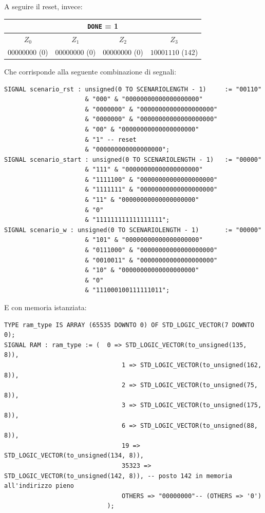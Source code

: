 \documentclass[a4paper,11pt]{article} %
\begin{document}
    \medskip

    A seguire il reset, invece:
    \medskip

    \begin{tabular}{|c|c|c|c|}
        \hline
        \multicolumn{4}{|c|}{\texttt{DONE} = 1} \\
        \hline
        $Z_0$            & $Z_1$            & $Z_2$            & $Z_3$              \\
        \hline
        $00000000$ ($0$) & $00000000$ ($0$) & $00000000$ ($0$) & $10001110$ ($142$) \\
        \hline
    \end{tabular}

    \newpage

    Che corrisponde alla seguente combinazione di segnali:

    \begin{verbatim}
SIGNAL scenario_rst : unsigned(0 TO SCENARIOLENGTH - 1)     := "00110"
                      & "000" & "00000000000000000000"
                      & "0000000" & "00000000000000000000"
                      & "0000000" & "00000000000000000000"
                      & "00" & "00000000000000000000"
                      & "1" -- reset
                      & "000000000000000000";
SIGNAL scenario_start : unsigned(0 TO SCENARIOLENGTH - 1)   := "00000"
                      & "111" & "00000000000000000000"
                      & "1111100" & "00000000000000000000"
                      & "1111111" & "00000000000000000000"
                      & "11" & "00000000000000000000"
                      & "0"
                      & "111111111111111111";
SIGNAL scenario_w : unsigned(0 TO SCENARIOLENGTH - 1)       := "00000"
                      & "101" & "00000000000000000000"
                      & "0111000" & "00000000000000000000"
                      & "0010011" & "00000000000000000000"
                      & "10" & "00000000000000000000"
                      & "0"
                      & "111000100111111011";
    \end{verbatim}

    E con memoria istanziata:

    \begin{verbatim}
TYPE ram_type IS ARRAY (65535 DOWNTO 0) OF STD_LOGIC_VECTOR(7 DOWNTO 0);
SIGNAL RAM : ram_type := (  0 => STD_LOGIC_VECTOR(to_unsigned(135, 8)),
                                1 => STD_LOGIC_VECTOR(to_unsigned(162, 8)),
                                2 => STD_LOGIC_VECTOR(to_unsigned(75, 8)),
                                3 => STD_LOGIC_VECTOR(to_unsigned(175, 8)),
                                6 => STD_LOGIC_VECTOR(to_unsigned(88, 8)),
                                19 => STD_LOGIC_VECTOR(to_unsigned(134, 8)),
                                35323 => STD_LOGIC_VECTOR(to_unsigned(142, 8)), -- posto 142 in memoria all'indirizzo pieno
                                OTHERS => "00000000"-- (OTHERS => '0')
                            );
    \end{verbatim}
\end{document}
